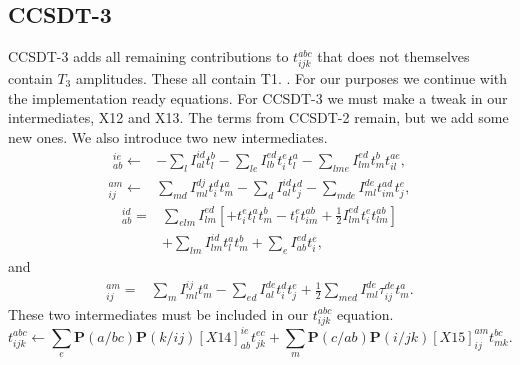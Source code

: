 \documentclass[graybox,sectrefs,envcountresetchap,open=right]{svmonodo}
\begin{document}
\subsection{CCSDT-3}
CCSDT-3 adds all remaining contributions to $t_{ijk}^{abc}$ that does not themselves contain $T_3$ amplitudes. These  all contain T1. . For our purposes we continue with the implementation ready equations. For CCSDT-3 we must make a tweak in our intermediates, X12 and X13. The terms from CCSDT-2 remain, but we add some new ones. We also introduce two new intermediates.
\begin{align}
[X12]_{ab}^{ie} \leftarrow  & - \sum_l I_{al}^{id} t_l^b - \sum_{le} I_{lb}^{ed} t_i^e t_l^a - \sum_{lme} I_{lm}^{ed} t_m^b t_{il}^{ae} ,
\end{align}
\begin{align}
[X13]_{ij}^{am} \leftarrow & 
\sum_{md} I_{ml}^{dj} t_i^d t_m^a
- \sum_d I_{al}^{id} t_j^d
- \sum_{mde} I_{ml}^{de} t_{im}^{ad} t_j^e ,
\end{align}
\begin{align}
[X14]_{ab}^{id} = & 
\sum_{elm} I_{lm}^{ed} \left[
+ t_i^e t_l^a t_m^b
- t_l^e t_{im}^{ab} 
+ \frac{1}{2} I_{lm}^{ed} t_i^e t_{lm}^{ab}
\right]
\nonumber \\ &
+ \sum_{lm} I_{lm}^{id} t_l^a t_m^b
+ \sum_e I_{ab}^{ed} t_i^e ,
\end{align}
and
\begin{align}
[X15]_{ij}^{am} = &
\sum_m I_{ml}^{ij} t_m^a
- \sum_{ed} I_{al}^{de} t_i^d t_j^e
+ \frac{1}{2} \sum_{med} I_{ml}^{de} \tau_{ij}^{de} t_m^a  .
\end{align}
These two intermediates must be included in our $t_{ijk}^{abc}$ equation.
\begin{equation}
t_{ijk}^{abc} \leftarrow
\sum_e \mathbf{P}(a/bc) \mathbf{P}(k/ij)
[X14]_{ab}^{ie} t_{jk}^{ec}
+ \sum_m \mathbf{P}(c/ab) \mathbf{P}(i/jk)
[X15]_{ij}^{am} t_{mk}^{bc} .
\end{equation}
\end{document}
